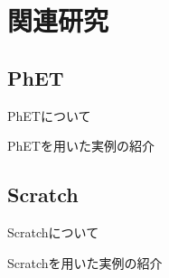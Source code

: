 \chapter{関連研究} \label{related}

\section{PhET}

PhET\cite{Perkins2006PhETIS}\cite{PhET}について

PhETを用いた実例の紹介
\cite{prima_learning_2018}
\cite{rehman_teaching_2021}

\section{Scratch}

Scratch\cite{Scratch}について

Scratchを用いた実例の紹介
\cite{Lpez2015ScratchAA}

